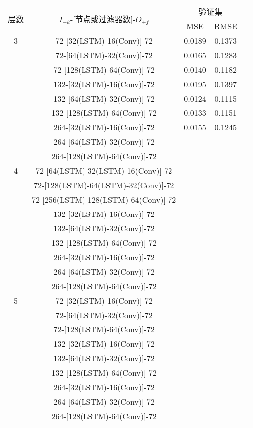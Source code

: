 \begin{table}[!htbp]
  \centering
  \label{tab:ss_number_out_72}
  \footnotesize
  \renewcommand{\arraystretch}{1}
  \begin{tabular}{ccccc}
    \toprule
    \multirow{2}{*}{层数} & \multirow{2}{*}{$I_{-k}$-[节点或过滤器数]-$O_{+f}$} & \multicolumn{2}{c}{验证集}\\
    \cmidrule(lr){3-4}
    \noalign{\smallskip}
    & & MSE & RMSE\\
    \midrule 
    3 & 72-[32(LSTM)-16(Conv)]-72 & 0.0189 & 0.1373 \\ 
      & 72-[64(LSTM)-32(Conv)]-72 & 0.0165 & 0.1283 \\
      & 72-[128(LSTM)-64(Conv)]-72 & 0.0140 & 0.1182 \\
      & 132-[32(LSTM)-16(Conv)]-72 & 0.0195 & 0.1397 \\
      & 132-[64(LSTM)-32(Conv)]-72 & 0.0124 & 0.1115 \\
      & 132-[128(LSTM)-64(Conv)]-72 & 0.0133 & 0.1151 \\
      & 264-[32(LSTM)-16(Conv)]-72 & 0.0155 & 0.1245 \\
      & 264-[64(LSTM)-32(Conv)]-72 &  &  \\
      & 264-[128(LSTM)-64(Conv)]-72 &  &  \\
    \hline
    4 & 72-[64(LSTM)-32(LSTM)-16(Conv)]-72 &  &  \\
      & 72-[128(LSTM)-64(LSTM)-32(Conv)]-72 &  &  \\
      & 72-[256(LSTM)-128(LSTM)-64(Conv)]-72 &  &  \\
      & 132-[32(LSTM)-16(Conv)]-72 &  &  \\
      & 132-[64(LSTM)-32(Conv)]-72 &  &  \\
      & 132-[128(LSTM)-64(Conv)]-72 &  &  \\
      & 264-[32(LSTM)-16(Conv)]-72 &  &  \\
      & 264-[64(LSTM)-32(Conv)]-72 &  &  \\
      & 264-[128(LSTM)-64(Conv)]-72 &  &  \\
    \hline
    5 & 72-[32(LSTM)-16(Conv)]-72 &  &  \\
      & 72-[64(LSTM)-32(Conv)]-72 &  &  \\
      & 72-[128(LSTM)-64(Conv)]-72 &  &  \\
      & 132-[32(LSTM)-16(Conv)]-72 &  &  \\
      & 132-[64(LSTM)-32(Conv)]-72 &  &  \\
      & 132-[128(LSTM)-64(Conv)]-72 &  &  \\
      & 264-[32(LSTM)-16(Conv)]-72 &  &  \\
      & 264-[64(LSTM)-32(Conv)]-72 &  &  \\
      & 264-[128(LSTM)-64(Conv)]-72 &  &  \\
    \bottomrule
  \end{tabular}
\end{table}

